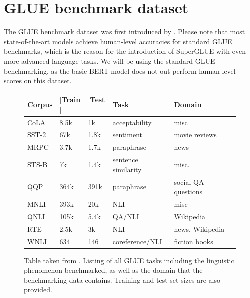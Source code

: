 \documentclass[a4paper,12pt,oneside,openright]{report}
\begin{document}
\section{GLUE benchmark dataset}

The GLUE benchmark dataset was first introduced by \cite{wang19}.
Please note that most state-of-the-art models achieve human-level accuracies for standard GLUE benchmarks, which is the reason for the introduction of SuperGLUE \cite{wang19b} with even more advanced language tasks.
We will be using the standard GLUE benchmarking, as the basic BERT model does not out-perform human-level scores on this dataset.

\begin{figure}[h]
\center
\begin{tabular}{
 l %
 l %
 l
 l
 l
 l
}
\toprule
\textbf{Corpus} & \textbf{ $|$Train$|$ } &\textbf{$|$Test$|$} & \textbf{Task} & \textbf{Domain}  \\
\midrule
CoLA  & 8.5k  &  1k   & acceptability &  misc \\

SST-2 & 67k &  1.8k  & sentiment &  movie reviews \\

MRPC & 3.7k &  1.7k & paraphrase & news \\
          
STS-B & 7k &  1.4k    & sentence similarity &  misc. \\
      
QQP & 364k &  391k & paraphrase  &  social QA questions\\	

MNLI & 393k &  20k  & NLI  &  misc \\

QNLI & 105k &  5.4k & QA/NLI &  Wikipedia \\

RTE & 2.5k &  3k      & NLI &  news, Wikipedia \\

WNLI & 634 &  146   & coreference/NLI & fiction books \\

      
\bottomrule
\end{tabular}
\caption{Table taken from \cite{wang19}. Listing of all GLUE tasks including the linguistic phenomenon benchmarked, as well as the domain that the benchmarking data contains. Training and test set sizes are also provided.}
\end{figure}
\end{document}
